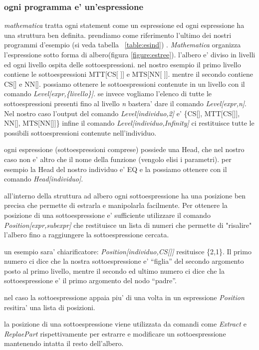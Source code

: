 \documentclass[12pt, a4paper]{article}
\begin{document}
\subsubsection{ogni programma e' un'espressione}
\label{sec:tree}
{\itshape mathematica} tratta ogni statement come un espressione ed ogni espressione ha una struttura ben definita.
prendiamo come riferimento l'ultimo dei nostri programmi d'esempio (si veda tabella ~\ref{table:esind})  .
{\itshape Mathematica} organizza l'espressione sotto forma di albero(figura \ref{figure:estree}).
l'albero e' diviso in livelli ed ogni livello ospita delle sottoespressioni. nel nostro esempio il primo livello contiene le sottoespressioni MTT[CS[ ]] e  MTS[NN[ ]].
mentre il secondo contiene CS[] e NN[]. possiamo ottenere le sottoespressioni contenute in un livello con il comando {\itshape Level[expr,\{livello\}]}. se invece vogliamo l'elenco di tutte le sottoespressioni presenti fino al livello {\itshape n} bastera' dare il comando {\itshape Level[expr,n]}. Nel nostro caso l'output del comando {\itshape Level[individuo,2]} e' \{CS[], MTT[CS[]], NN[], MTS[NN[]]\} infine il comando {\itshape Level[individuo,Infinity]} ci restituisce tutte le possibili sottoespressioni contenute nell'individuo.

ogni espressione (sottoespressioni comprese) possiede una Head, che nel nostro caso non e' altro che il nome della funzione (vengolo elisi i parametri). per esempio la Head del nostro individuo e' EQ e la possiamo ottenere con il comando {\itshape Head[individuo]}.

all'interno della struttura ad albero ogni sottoespressione ha una posizione ben precisa che permette di estrarla e manipolarla facilmente. Per ottenere la posizione di una sottoespressione e' sufficiente utilizzare il comando {\itshape Position[expr,subexpr]} che restituisce un lista di numeri che permette di "risalire" l'albero fino a raggiungere la sottoespressione cercata.

un esempio sara' chiarificatore: {\itshape Position[individuo,CS[]]} resituisce \{2,1\}. Il primo numero ci dice che la nostra sottoespressione e' ``figlia'' del secondo argomento posto al primo livello, mentre il secondo ed ultimo numero ci dice che la sottoespressione e' il primo argomento del nodo ``padre''.

nel caso la sottoespressione appaia piu' di una volta in un espressione {\itshape Position} resitira' una lista di posizioni.

la posizione di una sottoespressione viene utilizzata da comandi come {\itshape Extract} e {\itshape ReplaePart} rispettivamente per estrarre e modificare un sottoespressione mantenendo intatta il resto dell'albero.
\end{document}
